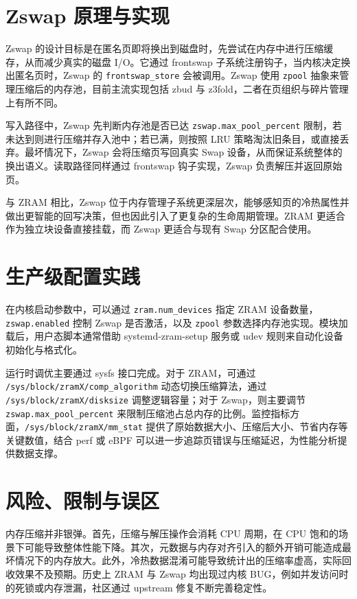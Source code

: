\chapter{Zswap 原理与实现}
Zswap 的设计目标是在匿名页即将换出到磁盘时，先尝试在内存中进行压缩缓存，从而减少真实的磁盘 I/O。它通过 frontswap 子系统注册钩子，当内核决定换出匿名页时，Zswap 的 \texttt{frontswap\_{}store} 会被调用。Zswap 使用 \texttt{zpool} 抽象来管理压缩后的内存池，目前主流实现包括 zbud 与 z3fold，二者在页组织与碎片管理上有所不同。\par
写入路径中，Zswap 先判断内存池是否已达 \texttt{zswap.max\_{}pool\_{}percent} 限制，若未达到则进行压缩并存入池中；若已满，则按照 LRU 策略淘汰旧条目，或直接丢弃。最坏情况下，Zswap 会将压缩页写回真实 Swap 设备，从而保证系统整体的换出语义。读取路径同样通过 frontswap 钩子实现，Zswap 负责解压并返回原始页。\par
与 ZRAM 相比，Zswap 位于内存管理子系统更深层次，能够感知页的冷热属性并做出更智能的回写决策，但也因此引入了更复杂的生命周期管理。ZRAM 更适合作为独立块设备直接挂载，而 Zswap 更适合与现有 Swap 分区配合使用。\par
\chapter{生产级配置实践}
在内核启动参数中，可以通过 \texttt{zram.num\_{}devices} 指定 ZRAM 设备数量，\texttt{zswap.enabled} 控制 Zswap 是否激活，以及 \texttt{zpool} 参数选择内存池实现。模块加载后，用户态脚本通常借助 systemd-zram-setup 服务或 udev 规则来自动化设备初始化与格式化。\par
运行时调优主要通过 sysfs 接口完成。对于 ZRAM，可通过 \texttt{/sys/block/zramX/comp\_{}algorithm} 动态切换压缩算法，通过 \texttt{/sys/block/zramX/disksize} 调整逻辑容量；对于 Zswap，则主要调节 \texttt{zswap.max\_{}pool\_{}percent} 来限制压缩池占总内存的比例。监控指标方面，\texttt{/sys/block/zramX/mm\_{}stat} 提供了原始数据大小、压缩后大小、节省内存等关键数值，结合 perf 或 eBPF 可以进一步追踪页错误与压缩延迟，为性能分析提供数据支撑。\par
\chapter{风险、限制与误区}
内存压缩并非银弹。首先，压缩与解压操作会消耗 CPU 周期，在 CPU 饱和的场景下可能导致整体性能下降。其次，元数据与内存对齐引入的额外开销可能造成最坏情况下的内存放大。此外，冷热数据混淆可能导致统计出的压缩率虚高，实际回收效果不及预期。历史上 ZRAM 与 Zswap 均出现过内核 BUG，例如并发访问时的死锁或内存泄漏，社区通过 upstream 修复不断完善稳定性。\par
